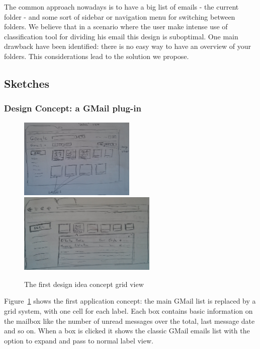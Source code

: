 \documentclass[a4paper,12pt]{report}
\begin{document}
The common approach nowadays is to have a big list of emails - the current folder - and some sort of sidebar or navigation menu for switching between folders. 
We believe that in a scenario where the user make intense use of classification tool for dividing his email this design is suboptimal.
One main drawback have been identified: there is no easy way to have an overview of your folders.
This considerations lead to the solution we propose.

\subsection{Sketches}

\subsubsection{Design Concept: a GMail plug-in}
\begin{figure}[H]
  \centering
  \includegraphics[height=1.5in]{old_grid}
  \includegraphics[height=1.5in]{old_grid_open}
  \caption{The first design idea concept grid view}
  \label{fig:old1}
\end{figure}
Figure~\ref{fig:old1} shows the first application concept: the main GMail list is replaced by a grid system, with one cell for each label. Each box contains basic information on the mailbox like the number of unread messages over the total, last message date and so on.
When a box is clicked it shows the classic GMail emails list with the option to expand and pass to normal label view. 
\end{document}
